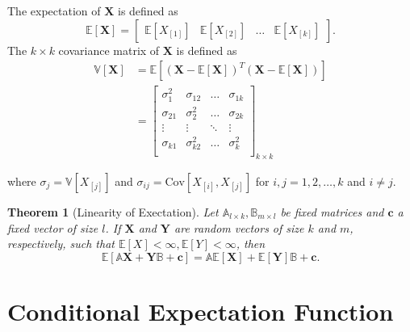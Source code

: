 \documentclass[
]{book}
\newtheorem{theorem}{Theorem}[chapter]
\theoremstyle{definition}
\theoremstyle{definition}
\theoremstyle{definition}
\theoremstyle{definition}
\theoremstyle{remark}
\begin{document}
The expectation of \({\boldsymbol{X}}\) is defined as
\[
{\mathbb{E}\left[ {\boldsymbol{X}} \right]}=
\begin{bmatrix}
{\mathbb{E}\left[ X_{[1]} \right]} &
{\mathbb{E}\left[ X_{[2]} \right]} &
\ldots &
{\mathbb{E}\left[ X_{[k]} \right]}
\end{bmatrix}.
\]
The \(k\times k\) covariance matrix of \({\boldsymbol{X}}\) is defined as
\[
\begin{aligned}
{\mathbb{V}\left[ {\boldsymbol{X}} \right]} &={\mathbb{E}\left[ ({\boldsymbol{X}}-{\mathbb{E}\left[ {\boldsymbol{X}} \right]})^T({\boldsymbol{X}}-{\mathbb{E}\left[ {\boldsymbol{X}} \right]}) \right]} \\
&=\begin{bmatrix}
\sigma_1^2 & \sigma_{12} & \ldots & \sigma_{1k} \\
\sigma_{21} & \sigma_{2}^2 & \ldots & \sigma_{2k} \\
\vdots & \vdots & \ddots & \vdots \\
\sigma_{k1} & \sigma_{k2}^2 & \ldots & \sigma_{k}^2 \\
\end{bmatrix}_{k\times k}
\end{aligned}
\]

where \(\sigma_j={\mathbb{V}\left[ X_{[j]} \right]}\) and \(\sigma_{ij}={\text{Cov}\left[ X_{[i]},X_{[j]} \right]}\) for \(i,j=1,2,\ldots,k\) and \(i\neq j\).

\begin{theorem}[Linearity of Exectation]
\protect\hypertarget{thm:explin}{}\label{thm:explin}Let \({\mathbb{A}}_{l\times k},{\mathbb{B}}_{m\times l}\) be fixed matrices and \({\boldsymbol{c}}\) a fixed vector of size \(l\). If \({\boldsymbol{X}}\) and \({\boldsymbol{Y}}\) are random vectors of size \(k\) and \(m\), respectively, such that \({\mathbb{E}\left[ X \right]}<\infty,{\mathbb{E}\left[ Y \right]}<\infty\), then
\[
{\mathbb{E}\left[ {\mathbb{A}}{\boldsymbol{X}}+{\boldsymbol{Y}}{\mathbb{B}}+{\boldsymbol{c}} \right]}={\mathbb{A}}{\mathbb{E}\left[ {\boldsymbol{X}} \right]}+{\mathbb{E}\left[ {\boldsymbol{Y}} \right]}{\mathbb{B}}+{\boldsymbol{c}}.
\]
\end{theorem}

\hypertarget{conditional-expectation-function}{%
\section{Conditional Expectation Function}\label{conditional-expectation-function}}
\end{document}
